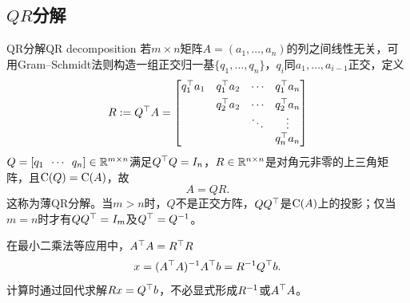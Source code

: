 \subsection{\texorpdfstring{$QR$}{QR}分解}

\begin{theorem}{QR分解}{QR decomposition}
	若$m \times n$矩阵$A = (a_1,\ldots,a_n)$的列之间线性无关，可用Gram--Schmidt法则构造一组正交归一基$\{q_1,\ldots,q_n\}$，$q_i$同$a_1,\ldots,a_{i-1}$正交，定义
	\begin{equation}\label{eq:la-qr-triangular-factor}
		R := Q^\top A = \begin{bmatrix}
			q_1^\top a_1&q_1^\top a_2&\cdots&q_1^\top a_n\\[1ex]
			&q_2^\top a_2&\cdots&q_2^\top a_n\\
			&&\ddots&\vdots\\
			&&&q_n^\top a_n
		\end{bmatrix}
	\end{equation}
	$Q = [q_1\enspace\cdots\enspace q_n] \in \mathbb{R}^{m\times n}$满足$Q^\top Q = I_n$，$R \in \mathbb{R}^{n\times n}$是对角元非零的上三角矩阵，且$\operatorname{C}(Q) = \operatorname{C}(A)$，故
	\begin{equation}
		A = QR.
	\end{equation}
	这称为薄QR分解。当$m > n$时，$Q$不是正交方阵，$QQ^\top$是$\operatorname{C}(A)$上的投影；仅当$m = n$时才有$QQ^\top = I_m$及$Q^\top = Q^{-1}$。
\end{theorem}

\begin{remark}
	在最小二乘法等应用中，$A^\top A = R^\top R$
	\begin{equation}\label{eq:la-least-squares-qr}
		x = (A^\top A)^{-1} A^\top b = R^{-1} Q^\top b.
	\end{equation}
	计算时通过回代求解$Rx = Q^\top b$，不必显式形成$R^{-1}$或$A^\top A$。
\end{remark}
